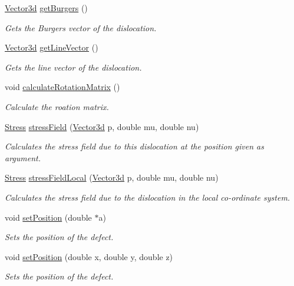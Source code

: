\begin{DoxyCompactItemize}
\hyperlink{classVector3d}{Vector3d} \hyperlink{classDislocation_a8b9d5bfd379a6933b2dfd5d0962c9bc2}{get\-Burgers} ()
\begin{DoxyCompactList}\small\item\em Gets the Burgers vector of the dislocation. \end{DoxyCompactList}\item 
\hyperlink{classVector3d}{Vector3d} \hyperlink{classDislocation_a393b62c79e74458b7d69b4d28adc476e}{get\-Line\-Vector} ()
\begin{DoxyCompactList}\small\item\em Gets the line vector of the dislocation. \end{DoxyCompactList}\item 
void \hyperlink{classDislocation_aa249f1f46486fd183757ed5049586e73}{calculate\-Rotation\-Matrix} ()
\begin{DoxyCompactList}\small\item\em Calculate the roation matrix. \end{DoxyCompactList}\item 
\hyperlink{classStress}{Stress} \hyperlink{classDislocation_af61cedf5305080ce0f55eb7177efe529}{stress\-Field} (\hyperlink{classVector3d}{Vector3d} p, double mu, double nu)
\begin{DoxyCompactList}\small\item\em Calculates the stress field due to this dislocation at the position given as argument. \end{DoxyCompactList}\item 
\hyperlink{classStress}{Stress} \hyperlink{classDislocation_a163d6c52c2281a1b7fa9aab058c8fb84}{stress\-Field\-Local} (\hyperlink{classVector3d}{Vector3d} p, double mu, double nu)
\begin{DoxyCompactList}\small\item\em Calculates the stress field due to the dislocation in the local co-\/ordinate system. \end{DoxyCompactList}\item 
void \hyperlink{classDefect_a2d233d13a8a93f6fba463a1fbc1c6c9f}{set\-Position} (double $\ast$a)
\begin{DoxyCompactList}\small\item\em Sets the position of the defect. \end{DoxyCompactList}\item 
void \hyperlink{classDefect_ad1a6acd8399d2ecabb7ce2b77623bbec}{set\-Position} (double x, double y, double z)
\begin{DoxyCompactList}\small\item\em Sets the position of the defect. \end{DoxyCompactList}\item 

\end{DoxyCompactItemize}
